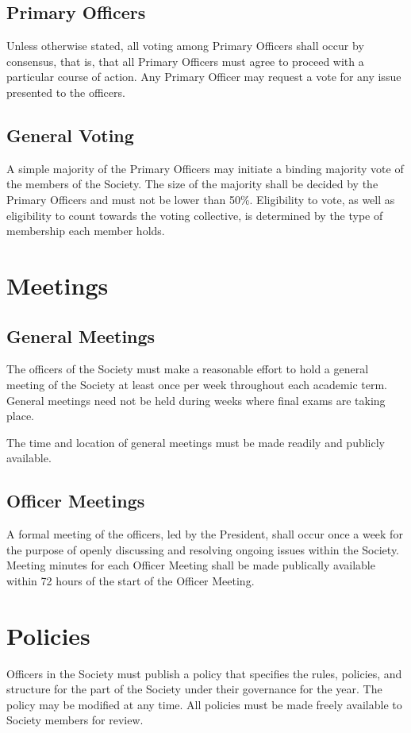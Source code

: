 \documentclass[american]{article}
\begin{document}
\subsection{Primary Officers}
Unless otherwise stated, all voting among Primary Officers shall occur by consensus, that is, that all Primary Officers must agree to proceed with a particular course of action. Any Primary Officer may request a vote for any issue presented to the officers.

\subsection{General Voting}
A simple majority of the Primary Officers may initiate a binding majority vote of the members of the Society. The size of the majority shall be decided by the Primary Officers and must not be lower than 50\%. Eligibility to vote, as well as eligibility to count towards the voting collective, is determined by the type of membership each member holds.

\section{Meetings}

\subsection{General Meetings}
The officers of the Society must make a reasonable effort to hold a general meeting of the Society at least once per week throughout each academic term. General meetings need not be held during weeks where final exams are taking place.

The time and location of general meetings must be made readily and publicly available.

\subsection{Officer Meetings}
A formal meeting of the officers, led by the President, shall occur once a week for the purpose of openly discussing and resolving ongoing issues within the Society. Meeting minutes for each Officer Meeting shall be made publically available within 72 hours of the start of the Officer Meeting.

\section{Policies}
Officers in the Society must publish a policy that specifies the rules, policies, and structure for the part of the Society under their governance for the year. The policy may be modified at any time. All policies must be made freely available to Society members for review.
\end{document}
